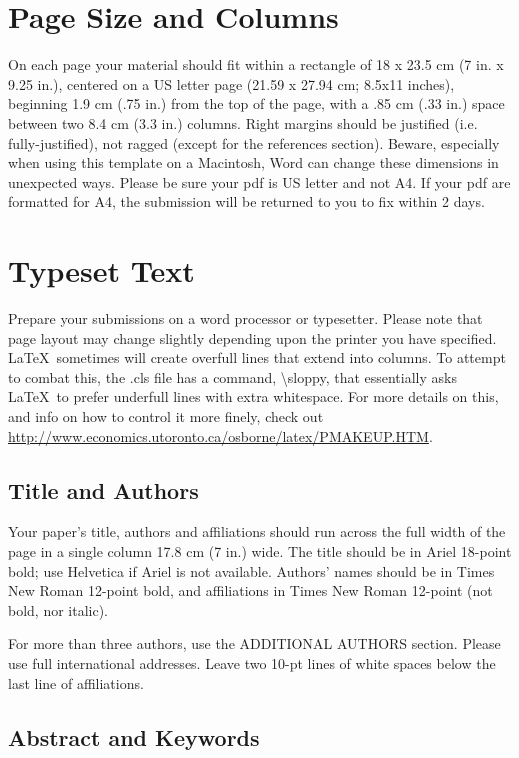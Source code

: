 \documentclass{scsPaperFormattingTemplate-LaTex-Revised20160302}
\begin{document}
\section{Page Size and Columns}

On each page your material should fit within a rectangle of 18 x 23.5 cm (7 in. x 9.25 in.), centered on a US letter page (21.59 x 27.94 cm; 8.5x11 inches), beginning 1.9 cm (.75 in.) from the top of the page, with a .85 cm (.33 in.) space between two 8.4 cm (3.3 in.) columns. Right margins should be justified (i.e. fully-justified), not ragged (except for the references section). Beware, especially when using this template on a Macintosh, Word can change these dimensions in unexpected ways.  Please be sure your pdf is US letter and not A4. If your pdf are formatted for A4, the submission will be returned to you to fix within 2 days.

\section{Typeset Text}

Prepare your submissions on a word processor or typesetter.  Please
note that page layout may change slightly depending upon the printer
you have specified.  \LaTeX\ sometimes will create overfull lines
that extend into columns.  To attempt to combat this, the .cls
file has a command, {\textbackslash}sloppy, that essentially asks
\LaTeX\ to prefer underfull lines with extra whitespace.  For more
details on this, and info on how to control it more finely, check out
{\url{http://www.economics.utoronto.ca/osborne/latex/PMAKEUP.HTM}}.

\subsection{Title and Authors}

Your paper’s title, authors and affiliations should run across the full width of the page in a single column 17.8 cm (7 in.) wide. The title should be in Ariel 18-point bold; use Helvetica if Ariel is not available. Authors’ names should be in Times New Roman 12-point bold, and affiliations in Times New Roman 12-point (not bold, nor italic). 

For more than three authors, use the ADDITIONAL AUTHORS section. Please use full international addresses. Leave two 10-pt lines of white spaces below the last line of affiliations. 

\subsection{Abstract and Keywords}
\end{document}
